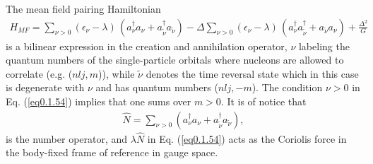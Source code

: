  The mean field pairing Hamiltonian 
\begin{align}\label{eq0.1.54}
H_{MF}=\sum_{\nu>0}(\epsilon_\nu-\lambda)\,(a^\dagger_\nu a_\nu+a^\dagger_{\tilde\nu} a_{\tilde\nu})-\Delta\sum_{\nu>0}(\epsilon_\nu-\lambda)\,(a^\dagger_\nu a^\dagger_{\tilde\nu}+a_{\tilde\nu} a_{\nu})+\frac{\Delta^2}{G}
\end{align}
is a bilinear expression in the creation and annihilation operator, $\nu$ labeling the quantum numbers of the single-particle orbitals where nucleons are allowed to correlate (e.g. ($nlj,m$)), while $\tilde \nu$ denotes the time reversal state which in this case is degenerate with $\nu$ and has quantum numbers ($nlj,-m$). The condition $\nu>0$ in Eq. (\ref{eq0.1.54}) implies that one sums over $m>0$. It is of notice that 
\begin{align}\label{eq0.1.55}
\hat N=\sum_{\nu>0}(a^\dagger_\nu a_\nu+a^\dagger_{\tilde\nu} a_{\tilde\nu}),
\end{align}
is the number operator, and $\lambda \hat N$ in Eq. (\ref{eq0.1.54}) acts as the Coriolis force in the body-fixed frame of reference in gauge space. 

